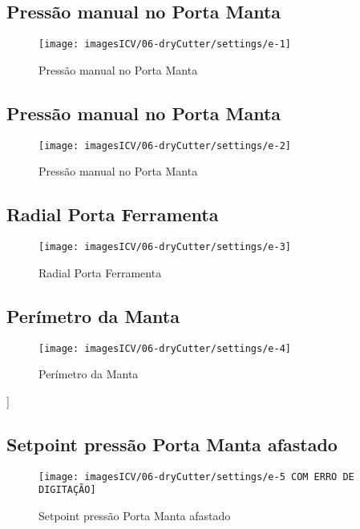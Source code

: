\usepackage{graphicx}
\newpage
\thispagestyle{fancy}
\vspace{\fill}

\subsection{Pressão manual no Porta Manta}
\begin{figure}
    \centering
    \texttt{[image: imagesICV/06-dryCutter/settings/e-1]}
    \caption{Pressão manual no Porta Manta}
\end{figure}
\newpage
\thispagestyle{fancy}
\vspace{\fill}

\subsection{Pressão manual no Porta Manta}
\begin{figure}
    \centering
    \texttt{[image: imagesICV/06-dryCutter/settings/e-2]}
    \caption{Pressão manual no Porta Manta}
\end{figure}
\newpage
\thispagestyle{fancy}
\vspace{\fill}

\subsection{Radial Porta Ferramenta}
\begin{figure}
    \centering
    \texttt{[image: imagesICV/06-dryCutter/settings/e-3]}
    \caption{Radial Porta Ferramenta}
\end{figure}
\newpage
\thispagestyle{fancy}
\vspace{\fill}

\subsection{Perímetro da Manta}
\begin{figure}
    \centering
    \texttt{[image: imagesICV/06-dryCutter/settings/e-4]}
    \caption{Perímetro da Manta}
\end{figure}]
\newpage
\thispagestyle{fancy}
\vspace{\fill}

\subsection{Setpoint pressão Porta Manta afastado}
\begin{figure}
    \centering
    \texttt{[image: imagesICV/06-dryCutter/settings/e-5 COM ERRO DE DIGITAÇÃO]}
    \caption{Setpoint pressão Porta Manta afastado}
\end{figure}
\newpage
\thispagestyle{fancy}
\vspace{\fill}

